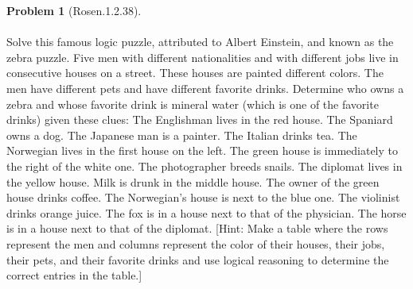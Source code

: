 \documentclass{article}
\theoremstyle{definition}
\newtheorem*{problem}{Problem}
\begin{document}
\begin{problem}[Rosen.1.2.38]\ \\
\ \\
Solve this famous logic puzzle, attributed to Albert Einstein,
and known as the zebra puzzle. Five men with
different nationalities and with different jobs live in consecutive
houses on a street. These houses are painted different
colors. The men have different pets and have different
favorite drinks. Determine who owns a zebra and
whose favorite drink is mineral water (which is one of the
favorite drinks) given these clues: The Englishman lives
in the red house. The Spaniard owns a dog. The Japanese
man is a painter. The Italian drinks tea. The Norwegian
lives in the first house on the left. The green house is
immediately to the right of the white one. The photographer
breeds snails. The diplomat lives in the yellow house.
Milk is drunk in the middle house. The owner of the green
house drinks coffee. The Norwegian’s house is next to the
blue one. The violinist drinks orange juice. The fox is in
a house next to that of the physician. The horse is in a
house next to that of the diplomat. [Hint: Make a table
where the rows represent the men and columns represent
the color of their houses, their jobs, their pets, and their
favorite drinks and use logical reasoning to determine the
correct entries in the table.]\ \\
\begin{compactenum}
\renewcommand{\theenumi}{\alph{enumi}}
\end{compactenum}
\end{problem}
\end{document}
